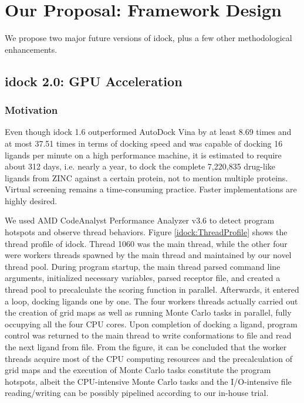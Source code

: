 \chapter{Our Proposal: Framework Design}

We propose two major future versions of idock, plus a few other methodological enhancements.

\section{idock 2.0: GPU Acceleration}

\subsection{Motivation}

Even though idock 1.6 outperformed AutoDock Vina \citep{595} by at least 8.69 times and at most 37.51 times in terms of docking speed and was capable of docking 16 ligands per minute on a high performance machine, it is estimated to require about 312 days, i.e. nearly a year, to dock the complete 7,220,835 drug-like ligands from ZINC against a certain protein, not to mention multiple proteins. Virtual screening remains a time-consuming practice. Faster implementations are highly desired.

We used AMD CodeAnalyst Performance Analyzer v3.6 to detect program hotspots and observe thread behaviors. Figure \ref{idock:ThreadProfile} shows the thread profile of idock. Thread 1060 was the main thread, while the other four were workers threads spawned by the main thread and maintained by our novel thread pool. During program startup, the main thread parsed command line arguments, initialized necessary variables, parsed receptor file, and created a thread pool to precalculate the scoring function in parallel. Afterwards, it entered a loop, docking ligands one by one. The four workers threads actually carried out the creation of grid maps as well as running Monte Carlo tasks in parallel, fully occupying all the four CPU cores. Upon completion of docking a ligand, program control was returned to the main thread to write conformations to file and read the next ligand from file. From the figure, it can be concluded that the worker threads acquire most of the CPU computing resources and the precalculation of grid maps and the execution of Monte Carlo tasks constitute the program hotspots, albeit the CPU-intensive Monte Carlo tasks and the I/O-intensive file reading/writing can be possibly pipelined according to our in-house trial.

